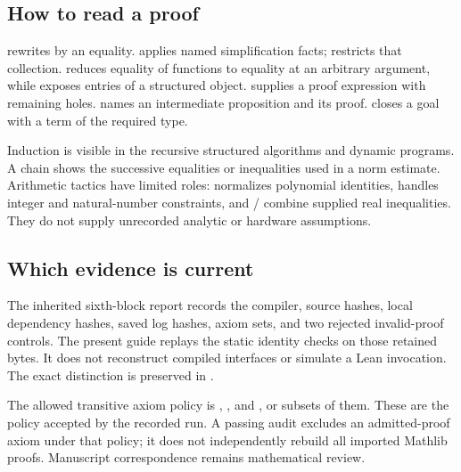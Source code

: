 \subsection{How to read a proof}
 rewrites by an equality.  applies named simplification facts;  restricts that collection.  reduces equality of functions to equality at an arbitrary argument, while  exposes entries of a structured object.  supplies a proof expression with remaining holes.  names an intermediate proposition and its proof.  closes a goal with a term of the required type.

Induction is visible in the recursive structured algorithms and dynamic programs. A  chain shows the successive equalities or inequalities used in a norm estimate. Arithmetic tactics have limited roles:  normalizes polynomial identities,  handles integer and natural-number constraints, and / combine supplied real inequalities. They do not supply unrecorded analytic or hardware assumptions.

\subsection{Which evidence is current}
The inherited sixth-block report records the compiler, source hashes, local dependency hashes, saved log hashes, axiom sets, and two rejected invalid-proof controls. The present guide replays the static identity checks on those retained bytes. It does not reconstruct compiled interfaces or simulate a Lean invocation. The exact distinction is preserved in .

The allowed transitive axiom policy is , , and , or subsets of them. These are the policy accepted by the recorded run. A passing audit excludes an admitted-proof axiom under that policy; it does not independently rebuild all imported Mathlib proofs. Manuscript correspondence remains mathematical review.
